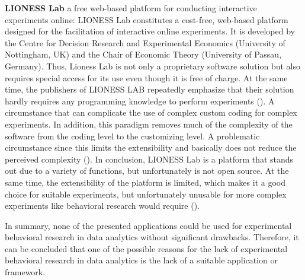 \textbf{LIONESS Lab} a free web-based platform for conducting interactive experiments online:
LIONESS Lab constitutes a cost-free, web-based platform designed for the facilitation of interactive online experiments. It is developed by the Centre for Decision Research and Experimental Economics (University of Nottingham, UK) and the Chair of Economic Theory (University of Passau, Germany). Thus, Lioness Lab is not only a proprietary software solution but also requires special access for its use even though it is free of charge. At the same time, the publishers of LIONESS LAB repeatedly emphasize that their solution hardly requires any programming knowledge to perform experiments (\cite{Giamattei.2020}). A circumstance that can complicate the use of complex custom coding for complex experiments. In addition, this paradigm removes much of the complexity of the software from the coding level to the customizing level. A problematic circumstance since this limits the extensibility and basically does not reduce the perceived complexity (\cite{Chou.2008}). In conclusion, LIONESS Lab is a platform that stands out due to a variety of functions, but unfortunately is not open source. At the same time, the extensibility of the platform is limited, which makes it a good choice for suitable experiments, but unfortunately unusable for more complex experiments like behavioral research would require (\cite{Giamattei.2020}). 

In summary, none of the presented applications could be used for experimental behavioral research in data analytics without significant drawbacks. Therefore, it can be concluded that one of the possible reasons for the lack of experimental behavioral research in data analytics is the lack of a suitable application or framework.
